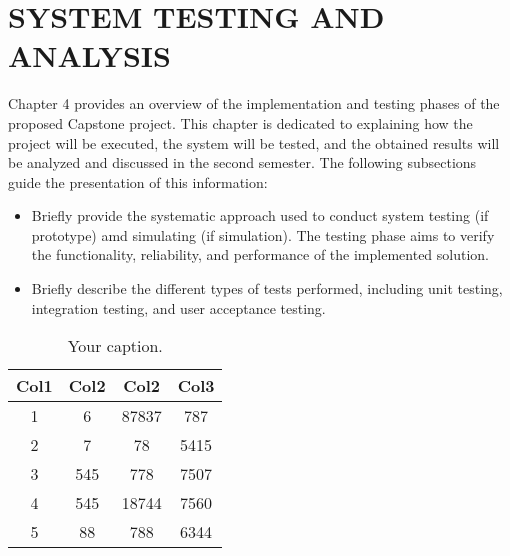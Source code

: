 \chapter{SYSTEM TESTING AND ANALYSIS}


Chapter 4 provides an overview of the implementation and testing phases of the proposed Capstone project. This chapter is dedicated to explaining how the project will be executed, the system will be tested, and the obtained results will be analyzed and discussed in the second semester. The following subsections guide the presentation of this information: 
\begin{itemize}
\item Briefly provide the systematic approach used to conduct system testing (if prototype) amd simulating (if simulation). The testing phase aims to verify the functionality, reliability, and performance of the implemented solution. 
\item Briefly describe the different types of tests performed, including unit testing, integration testing, and user acceptance testing.
\end{itemize}



\begin{table}[!h]
\begin{center}
\begin{tabular}{||c c c c||} 
 \hline
 Col1 & Col2 & Col2 & Col3 \\ [0.5ex] 
 \hline\hline
 1 & 6 & 87837 & 787 \\ 
 \hline
 2 & 7 & 78 & 5415 \\
 \hline
 3 & 545 & 778 & 7507 \\
 \hline
 4 & 545 & 18744 & 7560 \\
 \hline
 5 & 88 & 788 & 6344 \\ [1ex] 
 \hline
\end{tabular}
\caption{\label{demo-table}Your caption.}
\end{center}
\end{table}

